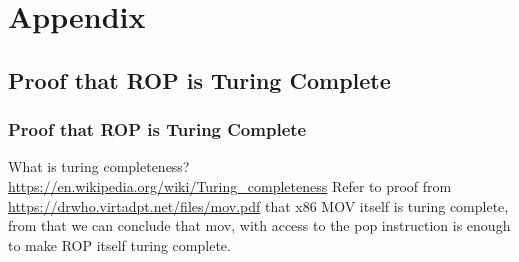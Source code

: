\documentclass[11pt]{beamer}
\begin{document}
\section*{Appendix}
\subsection*{Proof that ROP is Turing Complete}
\begin{frame}
    \frametitle{Proof that ROP is Turing Complete}
    What is turing completeness? \url{https://en.wikipedia.org/wiki/Turing_completeness}
    Refer to proof from \url{https://drwho.virtadpt.net/files/mov.pdf} that x86 MOV itself is turing complete, from that we can conclude that mov, with access to the pop instruction is enough to make ROP itself turing complete.
\end{frame}
\end{document}
